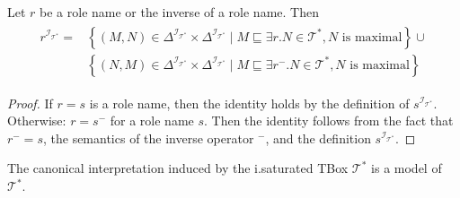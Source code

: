 \begin{lemma}
	Let $r$ be a role name or the inverse of a role name.
	Then
	\begin{align*}
		\begin{split}
			r^{\mathcal{I}_{\mathcal{T}^*}} =& \left\{ (M,N) \in \Delta^{\mathcal{I}_{\mathcal{T}^*}} \times \Delta^{\mathcal{I}_{\mathcal{T}^*}} \mid M \sqsubseteq \exists r.N \in \mathcal{T}^*, N \text{ is maximal}\right\}\cup\\
											 &\left\{ (N,M) \in \Delta^{\mathcal{I}_{\mathcal{T}^*}} \times \Delta^{\mathcal{I}_{\mathcal{T}^*}} \mid M \sqsubseteq \exists r^-.N \in \mathcal{T}^*, N \text{ is maximal}\right\}
		\end{split}
	\end{align*}
\end{lemma}
\begin{proof}
	If $r = s$ is a role name, then the identity holds by the definition of $s^{\mathcal{I}_{\mathcal{T}^*}}$.
	Otherwise: $r = s^-$ for a role name $s$.
	Then the identity follows from the fact that $r^- = s$,
	the semantics of the inverse operator ${}^-$,
	and the definition $s^{\mathcal{I}_{\mathcal{T}^*}}$.
\end{proof}
\begin{lemma}
	The canonical interpretation induced by the i.saturated TBox $\mathcal{T}^*$ is a model of $\mathcal{T}^*$.
\end{lemma}
